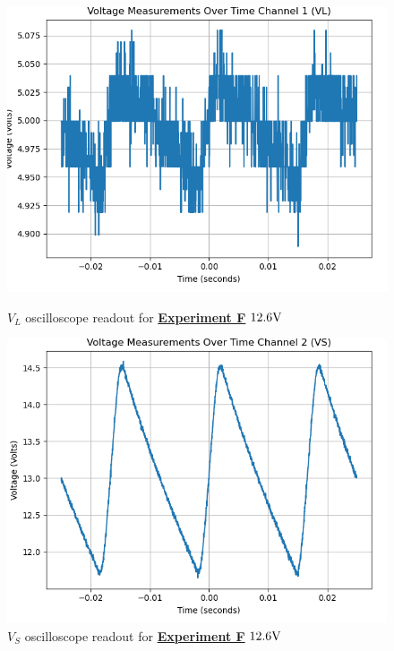 \documentclass[
	letterpaper
	12pt
]{template}
\newcommand{\bref}[2]{\textbf{\hyperref[#1]{#2}}}
\begin{document}
\begin{figure}[H]\label{data::F2}
	\centering
	\begin{minipage}[c]{0.45\textwidth}
		\centering
		\includegraphics[width=\textwidth]{figures/F/2--ch1.png}
	    \caption{$V_{L}$ oscilloscope readout for \bref{exp::F}{Experiment F} $12.6\unit V$ }
	\end{minipage}
	\hfill
	\begin{minipage}[c]{0.45\textwidth}
		\centering
		\includegraphics[width=\textwidth]{figures/F/2--ch2.png}
	    \caption{$V_{S}$ oscilloscope readout for \bref{exp::F}{Experiment F} $12.6\unit V$ }
	\end{minipage}
\end{figure}
\end{document}
